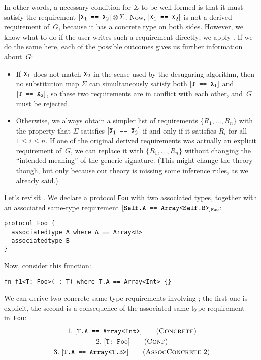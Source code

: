 \documentclass[../generics]{subfiles}
\begin{document}
In other words, a necessary condition for $\Sigma$ to be well-formed is that it must satisfy the requirement $[\texttt{$\texttt{X}_1$ == $\texttt{X}_2$}]\otimes\Sigma$. Now, $[\texttt{$\texttt{X}_1$ == $\texttt{X}_2$}]$ is not a derived requirement of~$G$, because it has a concrete type on both sides. However, we know what to do if the user writes such a requirement directly; we apply . If we do the same here, each of the possible outcomes gives us further information about~$G$:
\begin{itemize}
\item If $\texttt{X}_1$ does not match $\texttt{X}_2$ in the sense used by the desugaring algorithm, then no substitution map $\Sigma$ can simultaneously satisfy both $[\texttt{T == $\texttt{X}_1$}]$ and $[\texttt{T == $\texttt{X}_2$}]$, so these two requirements are in conflict with each other, and~$G$ must be rejected.

\item Otherwise, we always obtain a simpler list of requirements $\{R_1,\ldots,R_n\}$ with the property that $\Sigma$ satisfies $[\texttt{$\texttt{X}_1$ == $\texttt{X}_2$}]$ if and only if it satisfies $R_i$ for all $1\le i\le n$. If one of the original derived requirements was actually an explicit requirement of~$G$, we can replace it with $\{R_1,\ldots,R_n\}$ without changing the ``intended meaning'' of the generic signature. (This might change the theory though, but only because our theory is missing some inference rules, as we already said.)
\end{itemize}
Let's revisit . We declare a protocol \texttt{Foo} with two associated types, together with an associated same-type requirement $[\texttt{Self.A == Array<Self.B>}]_{\texttt{Foo}}$:
\begin{Verbatim}
protocol Foo {
  associatedtype A where A == Array<B>
  associatedtype B
}
\end{Verbatim}
Now, consider this function:
\begin{Verbatim}
fn f1<T: Foo>(_: T) where T.A == Array<Int> {}
\end{Verbatim}
We can derive two concrete same-type requirements involving \tT; the first one is explicit, the second is a consequence of the associated same-type requirement in~\texttt{Foo}:
\begin{gather*}
\ConcreteStep{T.A}{Array<Int>}{1}\\
\ConfStep{T}{Foo}{2}\\
\AssocConcreteStep{2}{T.A}{Array<T.B>}{3}
\end{gather*}
\end{document}
